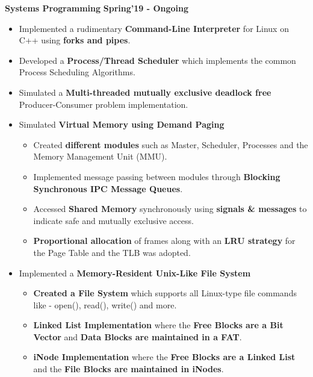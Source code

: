 \documentclass[10pt]{article}
\begin{document}
\spacedhrule{0.1ex}{1.0ex}
\large {\textbf{Systems Programming}} \normalsize 
\href{https://github.com/shmundhra/Systems-Programming}{\faGithub}
{\hfill} \textbf{Spring'19 - Ongoing}\\[-1.8em]
\begin{itemize}
\item Implemented a rudimentary \textbf{Command-Line Interpreter} for Linux on C++ using \textbf{forks and pipes}. \\[-1.9em]
\item Developed a \textbf{Process/Thread Scheduler} which implements the common Process Scheduling Algorithms.\\[-1.9em]
\item Simulated a \textbf{Multi-threaded mutually exclusive deadlock free} Producer-Consumer problem implementation.\\[-1.75em]
\item  
\begingroup
    \fontsize{11pt}{12pt}\selectfont
    Simulated \textbf{Virtual Memory using Demand Paging} \\[-1.75em]
\endgroup
    \begin{itemize}
    \item Created \textbf{different modules} such as Master, Scheduler, Processes and the Memory Management Unit (MMU).\\[-1.60em]
    \item Implemented message passing between modules through     \textbf{Blocking Synchronous IPC Message Queues}.\\[-1.60em]
    \item Accessed \textbf{Shared Memory} synchronously using \textbf{signals \& messages} to indicate safe and mutually exclusive access.\\[-1.60em]
    \item \textbf{Proportional allocation} of frames along with an \textbf{LRU strategy} for the Page Table and the TLB was adopted.\\[-1.70em]
    \end{itemize}
\item 
\begingroup
    \fontsize{11pt}{12pt}\selectfont
    Implemented a \textbf{Memory-Resident Unix-Like File System} \\[-1.75em]
\endgroup
    \begin{itemize}
    \item \textbf{Created a File System} which supports all Linux-type file commands like - open(), read(), write() and more.\\[-1.60em]
    \item \textbf{Linked List Implementation} where the \textbf{Free Blocks are a Bit Vector} and \textbf{Data Blocks are maintained in a FAT}.\\[-1.60em]
    \item \textbf{iNode Implementation} where the \textbf{Free Blocks are a Linked List}  and the \textbf{File Blocks are maintained in iNodes}.\\[-1.25em]
    \end{itemize}
\end{itemize}
\end{document}
